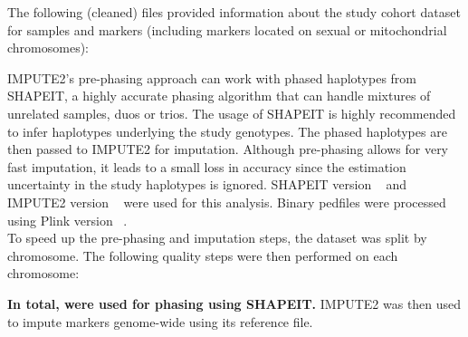 
The following (cleaned) files provided information about the study cohort
dataset for  samples and 
markers (including  markers located on sexual or
mitochondrial chromosomes):


IMPUTE2's pre-phasing approach can work with phased haplotypes from SHAPEIT, a
highly accurate phasing algorithm that can handle mixtures of unrelated
samples, duos or trios. The usage of SHAPEIT is highly recommended to infer
haplotypes underlying the study genotypes. The phased haplotypes are then
passed to IMPUTE2 for imputation. Although pre-phasing allows for very fast
imputation, it leads to a small loss in accuracy since the estimation
uncertainty in the study haplotypes is ignored. SHAPEIT version
~\cite{Delaneau13_23269371} and IMPUTE2 version
~\cite{Howie09_19543373,Howie11_22384356,Howie12_22820512}
were used for this analysis. Binary pedfiles were processed using Plink version
~\cite{Purcell07_17701901}.\\

To speed up the pre-phasing and imputation steps, the dataset was split by
chromosome. The following quality steps were then performed on each chromosome:


\textbf{In total,  were used for phasing using
SHAPEIT.} IMPUTE2 was then used to impute markers genome-wide using its
reference file.

